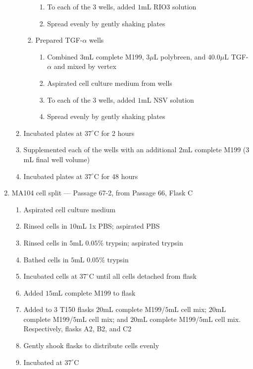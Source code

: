 \begin{enumerate}
\begin{enumerate}
\begin{enumerate}
\begin{enumerate}
							\item To each of the 3 wells, added $1$mL RIO3 solution
							\item Spread evenly by gently shaking plates
						\end{enumerate}
					\item Prepared TGF-$\alpha$ wells
						\begin{enumerate}
							\item Combined $3$mL complete M199, $3\mu$L polybreen, and $40.0\mu$L TGF-$\alpha$ and mixed by vertex
							\item Aspirated cell culture medium from wells
							\item To each of the 3 wells, added $1$mL NSV solution
							\item Spread evenly by gently shaking plates
						\end{enumerate}
				\end{enumerate}
			\item Incubated plates at $37^{\circ}$C for 2 hours
			\item Supplemented each of the wells with an additional $2$mL complete M199 ($3$mL final well volume)
			\item Incubated plates at $37^{\circ}$C for 48 hours
		\end{enumerate}
	\item MA104 cell split --- Passage 67-2, from Passage 66, Flask C
		\begin{enumerate}
			\item Aspirated cell culture medium
			\item Rinsed cells in $10$mL 1x PBS; aspirated PBS
			\item Rinsed cells in $5$mL $0.05$\% trypsin; aspirated trypsin
			\item Bathed cells in $5$mL $0.05$\% trypsin
			\item Incubated cells at $37^{\circ}$C until all cells detached from flask
			\item Added $15$mL complete M199 to flask
			\item Added to $3$ T150 flasks $20$mL complete M199/$5$mL cell mix; $20$mL complete M199/$5$mL cell mix; and $20$mL complete M199/$5$mL cell mix. Respectively, flasks A2, B2, and C2
			\item Gently shook flasks to distribute cells evenly
			\item Incubated at $37^{\circ}$C
		\end{enumerate}
\end{enumerate}

